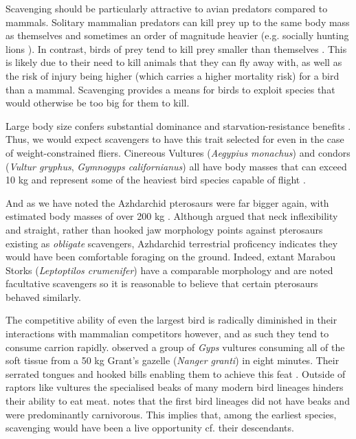 \documentclass[a4paper,12pt]{article}
\begin{document}
Scavenging should be particularly attractive to avian predators compared to mammals. %
Solitary mammalian predators can kill prey up to the same body mass as themselves and sometimes an order of magnitude heavier (e.g. socially hunting lions \citep{owen2008predator}).
In contrast, birds of prey tend to kill prey smaller than themselves \citep{slagsvold2007prey}.
This is likely due to their need to kill animals that they can fly away with, as well as the risk of injury being higher (which carries a higher mortality risk) for a bird than a mammal.
Scavenging provides a means for birds to exploit species that would otherwise be too big for them to kill.

Large body size confers substantial dominance and starvation-resistance benefits \citep{ruxton2004obligate}.
Thus, we would expect scavengers to have this trait selected for even in the case of weight-constrained fliers.
Cinereous Vultures (\textit{Aegypius monachus}) and condors (\textit{Vultur gryphus}, \textit{Gymnogyps californianus}) all have body masses that can exceed 10 kg and represent some of the heaviest bird species capable of flight \citep{ferguson2001raptors,donazar2002effects}.

And as we have noted the Azhdarchid pterosaurs were far bigger again, with estimated body masses of over 200 kg \citep{witton2010size}. Although \cite{witton2008reappraisal} argued that neck inflexibility and straight, rather than hooked jaw morphology points against pterosaurs existing as \textit{obligate} scavengers, Azhdarchid terrestrial proficency indicates they would have been comfortable foraging on the ground.
Indeed, extant Marabou Storks (\textit{Leptoptilos crumenifer}) %
have a comparable morphology and are noted facultative scavengers so it is reasonable to believe that certain pterosaurs behaved similarly.

The competitive ability of even the largest bird is radically diminished in their interactions with mammalian competitors however, and as such they tend to consume carrion rapidly. 
\cite{houston1974role} observed a group of \textit{Gyps} vultures consuming all of the soft tissue from a 50 kg Grant’s gazelle (\textit{Nanger granti}) in eight minutes. 
Their serrated tongues and hooked bills enabling them to achieve this feat \citep{houston1975digestive}. 
Outside of raptors like vultures the specialised beaks of many modern bird lineages hinders their ability to eat meat. 
 \cite{martyniuk2012field} notes that the first bird lineages did not have beaks and were predominantly carnivorous. 
This implies that, among the earliest species, scavenging would have been a live opportunity cf. their descendants. 
\end{document}

